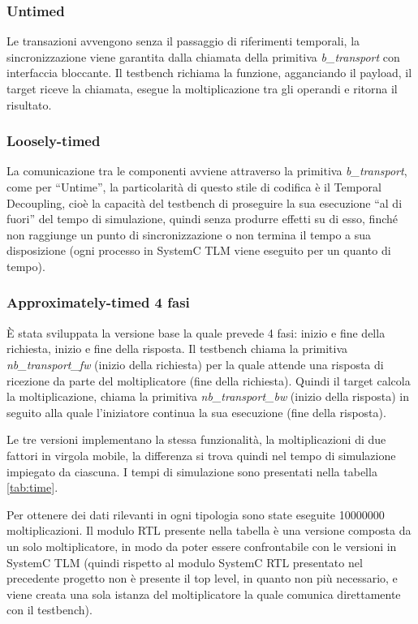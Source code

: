 \documentclass[]{IEEEtran}
\begin{document}
	\subsubsection{Untimed}
	Le transazioni avvengono senza il passaggio di riferimenti temporali, la sincronizzazione viene garantita dalla chiamata della primitiva \textit{b\_transport} con interfaccia bloccante. Il testbench richiama la funzione, agganciando il payload, il target riceve la chiamata, esegue la moltiplicazione tra gli operandi e ritorna il risultato.

	\subsubsection{Loosely-timed}
	La comunicazione tra le componenti avviene attraverso la primitiva \textit{b\_transport}, come per ``Untime'', la particolarit\`a di questo stile di codifica \`e il Temporal Decoupling, cio\`e la capacit\`a del testbench di proseguire la sua esecuzione ``al di fuori'' del tempo di simulazione, quindi senza produrre effetti su di esso, finch\'e non raggiunge un punto di sincronizzazione o non termina il tempo a sua disposizione (ogni processo in SystemC TLM viene eseguito per un quanto di tempo).

	\subsubsection{Approximately-timed 4 fasi}
	\`E stata sviluppata la versione base la quale prevede 4 fasi: inizio e fine della richiesta, inizio e fine della risposta. Il testbench chiama la primitiva \textit{nb\_transport\_fw} (inizio della richiesta) per la quale attende una risposta di ricezione da parte del moltiplicatore (fine della richiesta). Quindi il target calcola la moltiplicazione, chiama la primitiva \textit{nb\_transport\_bw} (inizio della risposta) in seguito alla quale l'iniziatore continua la sua esecuzione (fine della risposta).

	Le tre versioni implementano la stessa funzionalit\`a, la moltiplicazioni di due fattori in virgola mobile, la differenza si trova quindi nel tempo di simulazione impiegato da ciascuna. I tempi di simulazione sono presentati nella tabella \ref{tab:time}. 
	
	Per ottenere dei dati rilevanti in ogni tipologia sono state eseguite 10000000 moltiplicazioni. Il modulo RTL presente nella tabella \`e una versione composta da un solo moltiplicatore, in modo da poter essere confrontabile con le versioni in SystemC TLM (quindi rispetto al modulo SystemC RTL presentato nel precedente progetto non \`e presente il top level, in quanto non pi\`u necessario, e viene creata una sola istanza del moltiplicatore la quale comunica direttamente con il testbench).
	
\end{document}
